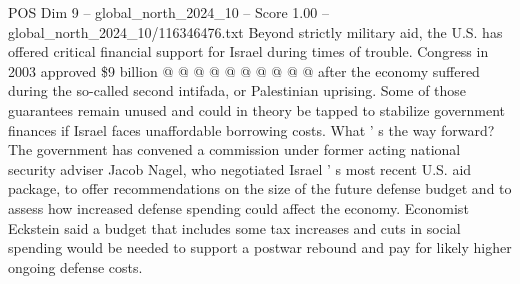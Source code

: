 \begin{textsample}{POS Dim 9 – global\_north\_2024\_10 – Score 1.00 – global\_north\_2024\_10/116346476.txt}
Beyond strictly military aid, the U.S. has offered critical financial support for Israel during times of trouble.
Congress in 2003 approved \$9 billion @ @ @ @ @ @ @ @ @ @ after the economy suffered during the so-called second intifada, or Palestinian uprising.
Some of those guarantees remain unused and could in theory be tapped to stabilize government finances if Israel faces unaffordable borrowing costs.
What ' s the way forward?
The government has convened a commission under former acting national security adviser Jacob Nagel, who negotiated Israel ' s most recent U.S. aid package, to offer recommendations on the size of the future defense budget and to assess how increased defense spending could affect the economy.
Economist Eckstein said a budget that includes some tax increases and cuts in social spending would be needed to support a postwar rebound and pay for likely higher ongoing defense costs.

\end{textsample}
